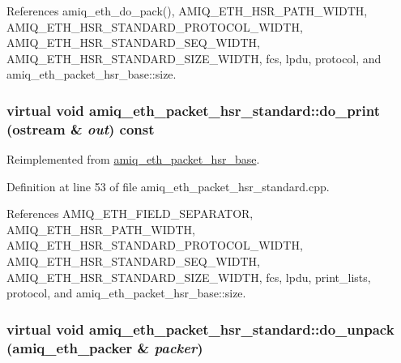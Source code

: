 References amiq\_\-eth\_\-do\_\-pack(), AMIQ\_\-ETH\_\-HSR\_\-PATH\_\-WIDTH, AMIQ\_\-ETH\_\-HSR\_\-STANDARD\_\-PROTOCOL\_\-WIDTH, AMIQ\_\-ETH\_\-HSR\_\-STANDARD\_\-SEQ\_\-WIDTH, AMIQ\_\-ETH\_\-HSR\_\-STANDARD\_\-SIZE\_\-WIDTH, fcs, lpdu, protocol, and amiq\_\-eth\_\-packet\_\-hsr\_\-base::size.\hypertarget{classamiq__eth__packet__hsr__standard_abaa39d881f90e05ae4acbb7fe5ebca0d}{
\subsubsection[{do\_\-print}]{\setlength{\rightskip}{0pt plus 5cm}virtual void amiq\_\-eth\_\-packet\_\-hsr\_\-standard::do\_\-print (ostream \& {\em out}) const}}
\label{classamiq__eth__packet__hsr__standard_abaa39d881f90e05ae4acbb7fe5ebca0d}


Reimplemented from \hyperlink{classamiq__eth__packet__hsr__base_a83b7ccb4b601e00ba5cfbbfde6658632}{amiq\_\-eth\_\-packet\_\-hsr\_\-base}.

Definition at line 53 of file amiq\_\-eth\_\-packet\_\-hsr\_\-standard.cpp.

References AMIQ\_\-ETH\_\-FIELD\_\-SEPARATOR, AMIQ\_\-ETH\_\-HSR\_\-PATH\_\-WIDTH, AMIQ\_\-ETH\_\-HSR\_\-STANDARD\_\-PROTOCOL\_\-WIDTH, AMIQ\_\-ETH\_\-HSR\_\-STANDARD\_\-SEQ\_\-WIDTH, AMIQ\_\-ETH\_\-HSR\_\-STANDARD\_\-SIZE\_\-WIDTH, fcs, lpdu, print\_\-lists, protocol, and amiq\_\-eth\_\-packet\_\-hsr\_\-base::size.\hypertarget{classamiq__eth__packet__hsr__standard_aac95578ea89db3bd0ec190ca87e731c8}{
\subsubsection[{do\_\-unpack}]{\setlength{\rightskip}{0pt plus 5cm}virtual void amiq\_\-eth\_\-packet\_\-hsr\_\-standard::do\_\-unpack ({\bf amiq\_\-eth\_\-packer} \& {\em packer})}}
\label{classamiq__eth__packet__hsr__standard_aac95578ea89db3bd0ec190ca87e731c8}


